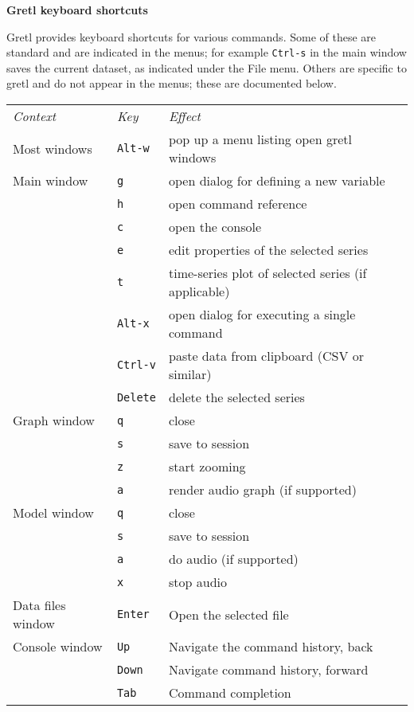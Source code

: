 \documentclass{article}
\begin{document}
\setlength{\parindent}{0pt}
\setlength{\parskip}{1ex}
\thispagestyle{empty}

\begin{center}
{\large \textbf{Gretl keyboard shortcuts}}
\end{center}

\textsf{Gretl} provides keyboard shortcuts for various commands. Some of
these are standard and are indicated in the menus; for example
\texttt{Ctrl-s} in the main window saves the current dataset, as
indicated under the \textsf{File} menu. Others are specific to
\textsf{gretl} and do not appear in the menus; these are documented
below.

\begin{center}
\begin{tabular}{p{}lp{}}
\textit{Context} & \textit{Key} & \textit{Effect} \\[6pt]

Most windows & \texttt{Alt-w} & 
  pop up a menu listing open \textsf{gretl} windows \\[6pt]

Main window & \texttt{g} & 
  open dialog for defining a new variable \\
 & \texttt{h} & open command reference \\
 & \texttt{c} & open the console \\
 & \texttt{e} & edit properties of the selected series \\
 & \texttt{t} & time-series plot of selected series (if applicable) \\
 & \texttt{Alt-x} & open dialog for executing a single command \\
 & \texttt{Ctrl-v} & paste data from clipboard (CSV or similar) \\
 & \texttt{Delete} & delete the selected series \\[6pt]

Graph window & \texttt{q} & close \\
 & \texttt{s} & save to session \\
 & \texttt{z} & start zooming \\
 & \texttt{a} & render audio graph (if supported) \\[6pt]

Model window & \texttt{q} & close \\
 & \texttt{s} & save to session \\
 & \texttt{a} & do audio (if supported) \\
 & \texttt{x} & stop audio \\[6pt]

Data files window & \texttt{Enter} & Open the selected file \\[6pt]

Console window & \texttt{Up} & Navigate the command history, back \\
 & \texttt{Down} & Navigate command history, forward \\
 & \texttt{Tab} & Command completion \\

\end{tabular}
\end{center}
\end{document}

